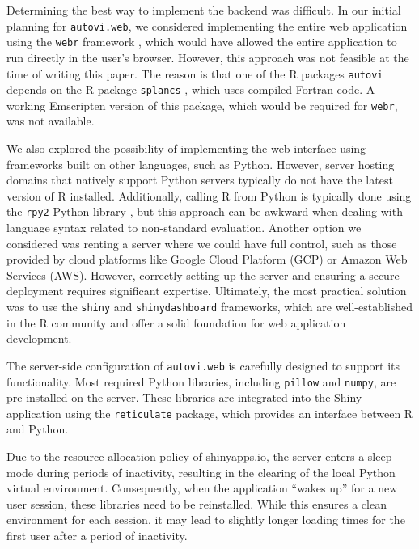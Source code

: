 \documentclass[
doublespace,
  times]{anzsauth}
\begin{document}
Determining the best way to implement the backend was difficult. In our
initial planning for \texttt{autovi.web}, we considered implementing the
entire web application using the \texttt{webr} framework \citep{webr},
which would have allowed the entire application to run directly in the
user's browser. However, this approach was not feasible at the time of
writing this paper. The reason is that one of the R packages
\texttt{autovi} depends on the R package \texttt{splancs}
\citep{splancs}, which uses compiled Fortran code. A working Emscripten
\citep{zakai2011emscripten} version of this package, which would be
required for \texttt{webr}, was not available.

We also explored the possibility of implementing the web interface using
frameworks built on other languages, such as Python. However, server
hosting domains that natively support Python servers typically do not
have the latest version of R installed. Additionally, calling R from
Python is typically done using the \texttt{rpy2} Python library
\citep{rpy2}, but this approach can be awkward when dealing with
language syntax related to non-standard evaluation. Another option we
considered was renting a server where we could have full control, such
as those provided by cloud platforms like Google Cloud Platform (GCP) or
Amazon Web Services (AWS). However, correctly setting up the server and
ensuring a secure deployment requires significant expertise. Ultimately,
the most practical solution was to use the \texttt{shiny} and
\texttt{shinydashboard} frameworks, which are well-established in the R
community and offer a solid foundation for web application development.

The server-side configuration of \texttt{autovi.web} is carefully
designed to support its functionality. Most required Python libraries,
including \texttt{pillow} and \texttt{numpy}, are pre-installed on the
server. These libraries are integrated into the Shiny application using
the \texttt{reticulate} package, which provides an interface between R
and Python.

Due to the resource allocation policy of shinyapps.io, the server enters
a sleep mode during periods of inactivity, resulting in the clearing of
the local Python virtual environment. Consequently, when the application
``wakes up'' for a new user session, these libraries need to be
reinstalled. While this ensures a clean environment for each session, it
may lead to slightly longer loading times for the first user after a
period of inactivity.
\end{document}
